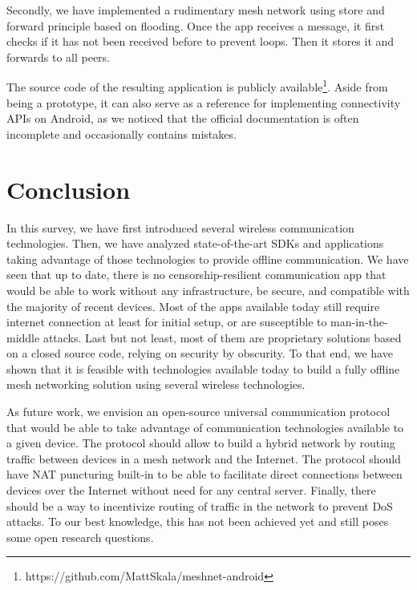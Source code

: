 \documentclass[conference,compsoc]{IEEEtran}
\begin{document}
Secondly, we have implemented a rudimentary mesh network using store and forward principle based on flooding. Once the app receives a message, it first checks if it has not been received before to prevent loops. Then it stores it and forwards to all peers.

The source code of the resulting application is publicly available\footnote{https://github.com/MattSkala/meshnet-android}. Aside from being a prototype, it can also serve as a reference for implementing connectivity APIs on Android, as we noticed that the official documentation is often incomplete and occasionally contains mistakes.


\section{Conclusion} \label{conclusion}


In this survey, we have first introduced several wireless communication technologies. Then, we have analyzed state-of-the-art SDKs and applications taking advantage of those technologies to provide offline communication. We have seen that up to date, there is no censorship-resilient communication app that would be able to work without any infrastructure, be secure, and compatible with the majority of recent devices. Most of the apps available today still require internet connection at least for initial setup, or are susceptible to man-in-the-middle attacks. Last but not least, most of them are proprietary solutions based on a closed source code, relying on security by obscurity.
To that end, we have shown that it is feasible with technologies available today to build a fully offline mesh networking solution using several wireless technologies.

As future work, we envision an open-source universal communication protocol that would be able to take advantage of communication technologies available to a given device. The protocol should allow to build a hybrid network by routing traffic between devices in a mesh network and the Internet. The protocol should have NAT puncturing built-in to be able to facilitate direct connections between devices over the Internet without need for any central server. Finally, there should be a way to incentivize routing of traffic in the network to prevent DoS attacks. To our best knowledge, this has not been achieved yet and still poses some open research questions.



\end{document}
